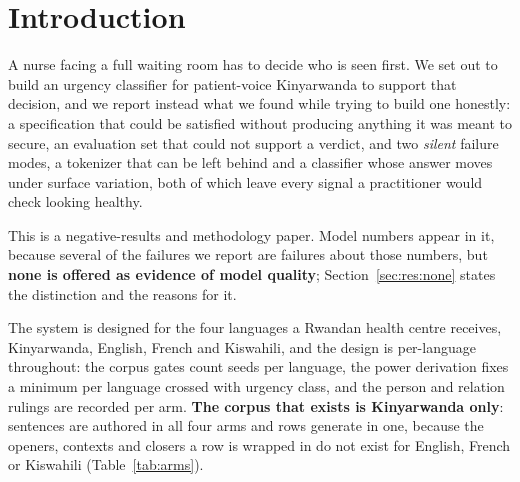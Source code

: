%
%

\section{Introduction}
\label{sec:introduction}

A nurse facing a full waiting room has to decide who is seen first. We set out to
build an urgency classifier for patient-voice Kinyarwanda to support that
decision, and we report instead what we found while trying to build one honestly:
a specification that could be satisfied without producing anything it was meant
to secure, an evaluation set that could not support a verdict, and two
\emph{silent} failure modes, a tokenizer that can be left behind and a
classifier whose answer moves under surface variation, both of which leave every
signal a practitioner would check looking healthy.

This is a negative-results and methodology paper. Model numbers appear in it,
because several of the failures we report are failures about those numbers, but
\textbf{none is offered as evidence of model quality}; Section~\ref{sec:res:none}
states the distinction and the reasons for it.

The system is designed for the four languages a Rwandan health centre receives,
Kinyarwanda, English, French and Kiswahili, and the design is per-language
throughout: the corpus gates count seeds per language, the power derivation fixes
a minimum per language crossed with urgency class, and the person and relation
rulings are recorded per arm. \textbf{The corpus that exists is Kinyarwanda
only}: sentences are authored in all four arms and rows generate in one, because
the openers, contexts and closers a row is wrapped in do not exist for English,
French or Kiswahili (Table~\ref{tab:arms}).

